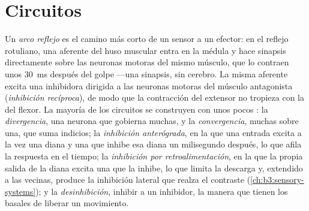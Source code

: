 \section{Circuitos}

\begin{definition}\label{def:b3:nervous-systems:circuits}
Un \emph{arco reflejo} es el camino más corto de un sensor a un
efector: en el reflejo rotuliano, una aferente del huso muscular entra
en la médula y hace sinapsis directamente sobre las neuronas motoras
del mismo músculo, que lo contraen unos \qty{30}{ms} después del golpe
---una sinapsis, sin cerebro. La misma aferente excita una 
inhibidora dirigida a las neuronas motoras del músculo antagonista
(\emph{inhibición recíproca}), de modo que la contracción del extensor
no tropieza con la del flexor. La mayoría de los circuitos se
construyen con unos pocos : la \emph{divergencia}, una neurona
que gobierna muchas, y la \emph{convergencia}, muchas sobre una, que
suma indicios; la \emph{inhibición anterógrada}, en la que una entrada
excita a la vez una diana y una  que inhibe esa diana un
milisegundo después, lo que afila la respuesta en el tiempo; la
\emph{inhibición por retroalimentación}, en la que la propia salida de
la diana excita una  que la inhibe, lo que limita la
descarga y, extendido a las vecinas, produce la inhibición lateral que
realza el contraste (\cref{ch:b3:sensory-systems}); y la
\emph{desinhibición}, inhibir a un inhibidor, la manera que tienen los
 basales de liberar un movimiento.
\end{definition}

